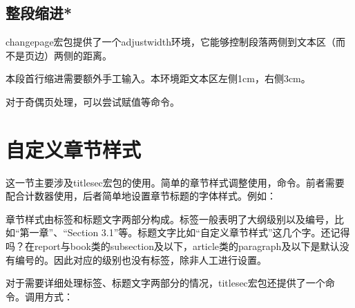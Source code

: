 \subsection{整段缩进*}
changepage宏包提供了一个adjustwidth环境，它能够控制段落两侧到文本区（而不是页边）两侧的距离。
\begin{latex}{}
\begin{adjustwidth}{1cm}{3cm}
本段首行缩进需要额外手工输入。本环境距文本区左侧1cm，右侧3cm。
\end{adjustwidth}
\end{latex}

对于奇偶页处理，可以尝试赋值\latexline{\\leftskip}等命令。

\section{自定义章节样式}
\label{sec:titlesec}
这一节主要涉及titlesec宏包的使用。简单的章节样式调整使用\latexline{\\titlelabel}，\latexline{\\titleformat*}命令。前者需要配合计数器使用，后者简单地设置章节标题的字体样式。例如：

章节样式由标签和标题文字两部分构成。标签一般表明了大纲级别以及编号，比如“第一章”、“Section 3.1”等。标题文字比如“自定义章节样式”这几个字。还记得吗？在report与book类的subsection及以下，article类的paragraph及以下是默认没有编号的。因此对应的级别也没有标签，除非人工进行设置。

对于需要详细处理标签、标题文字两部分的情况，titlesec宏包还提供了一个\latexline{\\titleformat}命令。调用方式：

